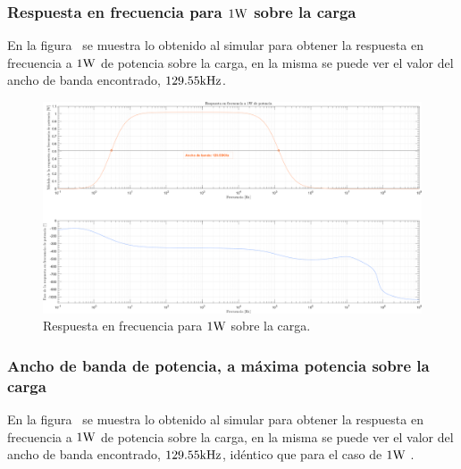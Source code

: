 \clearpage

\subsubsection{Respuesta en frecuencia para $1 \si[per-mode=symbol]{\watt}$ sobre la carga}

En la figura~ se muestra lo obtenido al simular para obtener la respuesta en frecuencia a $1 \si[per-mode=symbol]{\watt}$ de potencia sobre la carga, en la misma se puede ver el valor del ancho de banda encontrado, $129.55 \si[per-mode=symbol]{\kilo\hertz}$.

\begin{figure}[H] %
\begin{center}
\includegraphics[width=0.9 \textwidth, angle=90]{./img/puntos/P11d_RF_1W.png}
\caption{\label{fig:fig_RF_1W}\footnotesize{Respuesta en frecuencia para $1 \si[per-mode=symbol]{\watt}$ sobre la carga.}}
\end{center}
\end{figure}


\clearpage

\subsubsection{Ancho de banda de potencia, a máxima potencia sobre la carga}

En la figura~ se muestra lo obtenido al simular para obtener la respuesta en frecuencia a $1 \si[per-mode=symbol]{\watt}$ de potencia sobre la carga, en la misma se puede ver el valor del ancho de banda encontrado, $129.55 \si[per-mode=symbol]{\kilo\hertz}$, idéntico que para el caso de $1 \si[per-mode=symbol]{\watt}$ .

